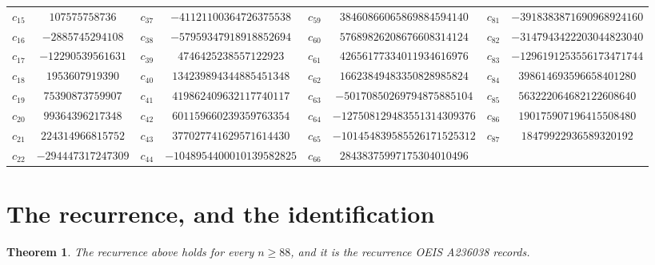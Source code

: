 \documentclass[11pt,a4paper]{article}
\theoremstyle{plain}
\newtheorem{theorem}{Theorem}
\theoremstyle{definition}
\begin{document}
\begin{center}
\begin{tabular}{cccccccc}
$c_{15}$ & $107575758736$ & $c_{37}$ & $-41121100364726375538$ & $c_{59}$ & $38460866065869884594140$ & $c_{81}$ & $-3918383871690968924160$ \\
$c_{16}$ & $-2885745294108$ & $c_{38}$ & $-57959347918918852694$ & $c_{60}$ & $57689826208676608314124$ & $c_{82}$ & $-3147943422203044823040$ \\
$c_{17}$ & $-12290539561631$ & $c_{39}$ & $4746425238557122923$ & $c_{61}$ & $42656177334011934616976$ & $c_{83}$ & $-1296191253556173471744$ \\
$c_{18}$ & $1953607919390$ & $c_{40}$ & $134239894344885451348$ & $c_{62}$ & $16623849483350828985824$ & $c_{84}$ & $398614693596658401280$ \\
$c_{19}$ & $75390873759907$ & $c_{41}$ & $419862409632117740117$ & $c_{63}$ & $-50170850269794875885104$ & $c_{85}$ & $563222064682122608640$ \\
$c_{20}$ & $99364396217348$ & $c_{42}$ & $601159660239359763354$ & $c_{64}$ & $-127508129483551314309376$ & $c_{86}$ & $190175907196415508480$ \\
$c_{21}$ & $224314966815752$ & $c_{43}$ & $377027741629571614430$ & $c_{65}$ & $-101454839585526171525312$ & $c_{87}$ & $18479922936589320192$ \\
$c_{22}$ & $-294447317247309$ & $c_{44}$ & $-1048954400010139582825$ & $c_{66}$ & $28438375997175304010496$ &  &  \\
\end{tabular}
\end{center}

\section{The recurrence, and the identification}

\begin{theorem}
The recurrence above holds for every $n\ge88$, and it is the recurrence OEIS A236038 records.
\end{theorem}
\end{document}
